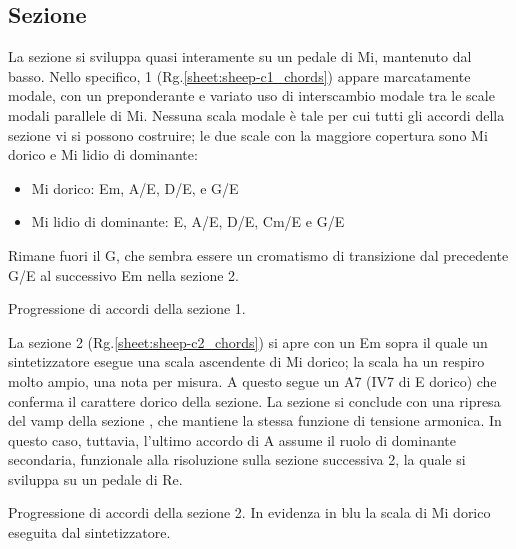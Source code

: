 \documentclass[class=book, crop=false, oneside, 12pt]{standalone}
\begin{document}
    \subsection{Sezione }
    La sezione  si sviluppa quasi interamente su un pedale di Mi, mantenuto dal basso. Nello specifico, 1 (Rg.\ref{sheet:sheep-c1_chords}) appare marcatamente modale, con un preponderante e variato uso di interscambio modale tra le scale modali parallele di Mi. Nessuna scala modale è tale per cui tutti gli accordi della sezione vi si possono costruire; le due scale con la maggiore copertura sono Mi dorico e Mi lidio di dominante:
    \begin{itemize}
        \item Mi dorico: Em, A/E, D/E, e G/E
        \item Mi lidio di dominante: E, A/E, D/E, C\sharp m/E e G/E
    \end{itemize}

    Rimane fuori il G\flat, che sembra essere un cromatismo di transizione dal precedente G/E al successivo Em nella sezione 2.
    
    \begin{sheet}[htb]
        \centering
        \caption[Progressione di accordi della sezione 1.]{Progressione di accordi della sezione 1.}
        \label{sheet:sheep-c1_chords}
    \end{sheet}

    La sezione 2 (Rg.\ref{sheet:sheep-c2_chords})  si apre con un Em  sopra il quale un sintetizzatore esegue una scala ascendente di Mi dorico; la scala ha un respiro molto ampio, una nota per misura. A questo segue un A7 (IV7 di E dorico) che conferma il carattere dorico della sezione. La sezione si conclude con una ripresa del vamp della sezione , che mantiene la stessa funzione di tensione armonica. In questo caso, tuttavia, l'ultimo accordo di A assume il ruolo di dominante secondaria, funzionale alla risoluzione sulla sezione successiva 2, la quale si sviluppa su un pedale di Re.

    \begin{sheet}[htb]
        \centering
        \caption[Progressione di accordi della sezione 2.]{Progressione di accordi della sezione 2. In evidenza in blu la scala di Mi dorico eseguita dal sintetizzatore.}
        \label{sheet:sheep-c2_chords}
    \end{sheet}
\end{document}
